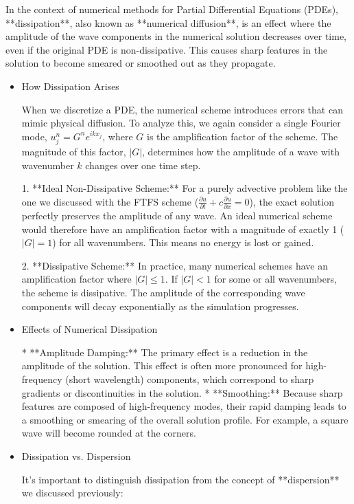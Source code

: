 \documentclass[12pt,a4paper]{report}
\begin{document}
In the context of numerical methods for Partial Differential Equations (PDEs), **dissipation**, also known as **numerical diffusion**, is an effect where the amplitude of the wave components in the numerical solution decreases over time, even if the original PDE is non-dissipative. This causes sharp features in the solution to become smeared or smoothed out as they propagate.
\begin{itemize}

\item  How Dissipation Arises

When we discretize a PDE, the numerical scheme introduces errors that can mimic physical diffusion. To analyze this, we again consider a single Fourier mode, \(u_j^n = G^n e^{ikx_j}\), where \(G\) is the amplification factor of the scheme. The magnitude of this factor, \(|G|\), determines how the amplitude of a wave with wavenumber \(k\) changes over one time step.

1.  **Ideal Non-Dissipative Scheme:** For a purely advective problem like the one we discussed with the FTFS scheme (\(\frac{\partial u}{\partial t} + c \frac{\partial u}{\partial x} = 0\)), the exact solution perfectly preserves the amplitude of any wave. An ideal numerical scheme would therefore have an amplification factor with a magnitude of exactly 1 (\(|G| = 1\)) for all wavenumbers. This means no energy is lost or gained.

2.  **Dissipative Scheme:** In practice, many numerical schemes have an amplification factor where \(|G| \leq 1\). If \(|G| < 1\) for some or all wavenumbers, the scheme is dissipative. The amplitude of the corresponding wave components will decay exponentially as the simulation progresses.

\item  Effects of Numerical Dissipation

*   **Amplitude Damping:** The primary effect is a reduction in the amplitude of the solution. This effect is often more pronounced for high-frequency (short wavelength) components, which correspond to sharp gradients or discontinuities in the solution.
*   **Smoothing:** Because sharp features are composed of high-frequency modes, their rapid damping leads to a smoothing or smearing of the overall solution profile. For example, a square wave will become rounded at the corners.

\item  Dissipation vs. Dispersion

It's important to distinguish dissipation from the concept of **dispersion** we discussed previously:


\end{itemize}
\end{document}
